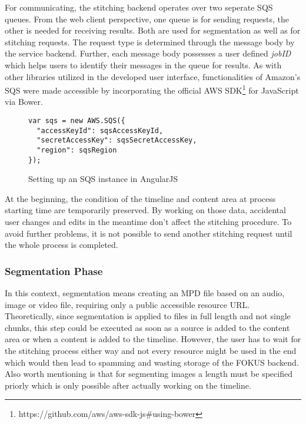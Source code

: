 \documentclass[conference]{IEEEtran}
\begin{document}
For communicating, the stitching backend operates over two seperate SQS queues.
From the web client perspective, one queue is for sending requests, the other is needed for receiving results.
Both are used for segmentation as well as for stitching requests.
The request type is determined through the message body by the service backend.
Further, each message body possesses a user defined \textit{jobID} which helps users to identify their messages in the queue for results.
As with other libraries utilized in the developed user interface, functionalities of Amazon's SQS were made accessible by incorporating the official AWS SDK\footnote{https://github.com/aws/aws-sdk-js\#using-bower} for JavaScript via Bower.
\begin{figure}[H]
\begin{lstlisting}
var sqs = new AWS.SQS({
  "accessKeyId": sqsAccessKeyId,
  "secretAccessKey": sqsSecretAccessKey,
  "region": sqsRegion
});
\end{lstlisting}
\caption{Setting up an SQS instance in AngularJS}
\end{figure}
At the beginning, the condition of the timeline and content area at process starting time are temporarily preserved.
By working on those data, accidental user changes and edits in the meantime don't affect the stitching procedure.
To avoid further problems, it is not possible to send another stitching request until the whole process is completed.
\\
\subsubsection{Segmentation Phase}
In this context, segmentation means creating an MPD file based on an audio, image or video file, requiring only a public accessible resource URL.
Theoretically, since segmentation is applied to files in full length and not single chunks, this step could be executed as soon as a source is added to the content area or when a content is added to the timeline.
However, the user has to wait for the stitching process either way and not every resource might be used in the end which would then lead to spamming and wasting storage of the FOKUS backend.
Also worth mentioning is that for segmenting images a length must be specified priorly which is only possible after actually working on the timeline.
\end{document}
